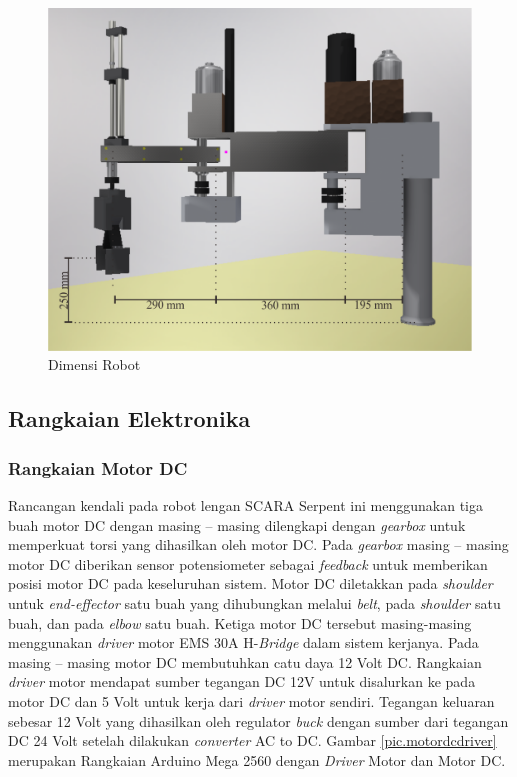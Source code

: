 \begin{figure}[H]
	\centering
	\includegraphics[height=9 cm]{gambar/SCARAdimensi.png}
	\caption{Dimensi Robot}
	\label{pic.SCARAdimensi}
\end{figure}

\subsection{Rangkaian Elektronika}
\subsubsection{Rangkaian Motor DC}
Rancangan kendali pada robot lengan SCARA Serpent ini menggunakan tiga buah motor DC dengan masing – masing dilengkapi dengan \textit{gearbox} untuk memperkuat torsi yang dihasilkan oleh motor DC. Pada  \textit{gearbox} masing – masing motor  DC diberikan sensor potensiometer sebagai \textit{feedback} untuk memberikan posisi motor DC pada keseluruhan sistem. Motor DC diletakkan pada \textit{shoulder} untuk \textit{end-effector} satu buah yang dihubungkan melalui \textit{belt}, pada \textit{shoulder} satu buah, dan pada \textit{elbow} satu buah. Ketiga motor DC tersebut masing-masing menggunakan \textit{driver} motor EMS 30A H-\textit{Bridge} dalam sistem kerjanya. Pada masing – masing motor DC membutuhkan catu daya 12 Volt DC. Rangkaian \textit{driver} motor mendapat sumber tegangan DC 12V untuk disalurkan ke pada motor DC dan 5 Volt untuk kerja dari \textit{driver} motor sendiri. Tegangan keluaran sebesar 12 Volt yang dihasilkan oleh regulator \textit{buck} dengan sumber dari tegangan DC 24 Volt setelah dilakukan \textit{converter} AC to DC. Gambar \ref{pic.motordcdriver} merupakan Rangkaian Arduino Mega 2560 dengan \textit{Driver} Motor dan Motor DC.  

